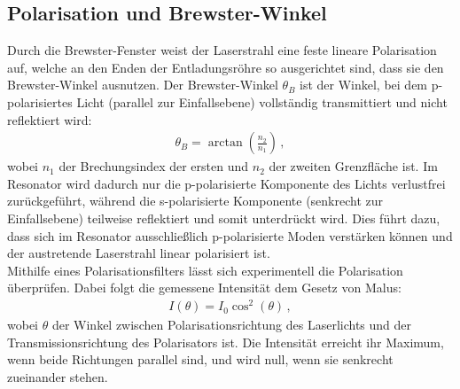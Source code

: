 \subsection{Polarisation und Brewster-Winkel}
Durch die Brewster-Fenster weist der Laserstrahl eine feste lineare Polarisation auf,  welche an den Enden der Entladungsröhre so ausgerichtet sind, dass sie den Brewster-Winkel ausnutzen. 
Der Brewster-Winkel $\theta_B$ ist der Winkel, bei dem p-polarisiertes Licht (parallel zur Einfallsebene) vollständig transmittiert und nicht reflektiert wird:
\begin{align}
    \theta_B = \arctan\left( \frac{n_2}{n_1} \right)\,, \label{eqn:Brewster}
\end{align}
wobei $n_1$ der Brechungsindex der ersten und $n_2$ der zweiten Grenzfläche ist. 
Im Resonator wird dadurch nur die p-polarisierte Komponente des Lichts verlustfrei zurückgeführt, während die s-polarisierte Komponente (senkrecht zur Einfallsebene) teilweise reflektiert und somit unterdrückt wird. 
Dies führt dazu, dass sich im Resonator ausschließlich p-polarisierte Moden verstärken können und der austretende Laserstrahl linear polarisiert ist.\\
Mithilfe eines Polarisationsfilters lässt sich experimentell die Polarisation überprüfen.
Dabei folgt die gemessene Intensität dem Gesetz von Malus:
\begin{align}
    I(\theta) = I_0 \cos^2(\theta)\,, \label{eqn:malus}
\end{align}
wobei $\theta$ der Winkel zwischen Polarisationsrichtung des Laserlichts und der Transmissionsrichtung des Polarisators ist. 
Die Intensität erreicht ihr Maximum, wenn beide Richtungen parallel sind, und wird null, wenn sie senkrecht zueinander stehen. \cite{laser}

